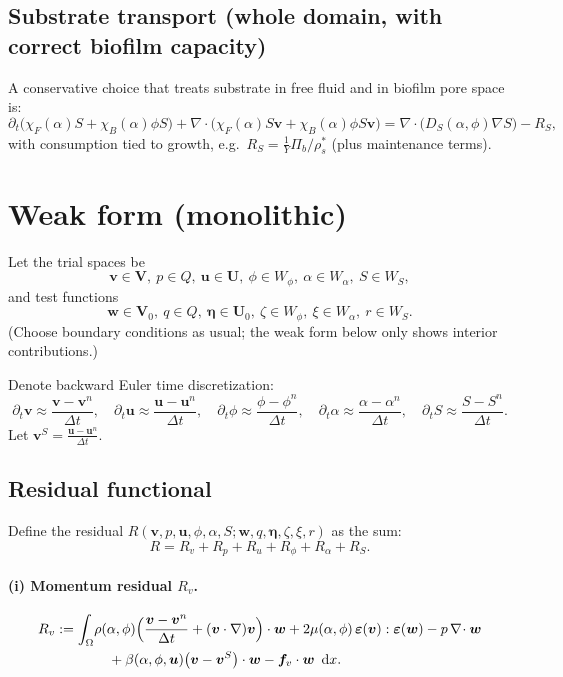 \documentclass[11pt]{article}
\newcommand{\dd}{\,\mathrm{d}}
\newcommand{\grad}{\nabla}
\newcommand{\divv}{\nabla\!\cdot}
\newcommand{\eps}{\bm{\varepsilon}}
\newcommand{\Dt}{\partial_t}
\begin{document}
\subsection{Substrate transport (whole domain, with correct biofilm capacity)}
A conservative choice that treats substrate in free fluid and in biofilm pore space is:
\begin{equation}\label{eq:substrate}
\Dt\big(\chi_F(\alpha)S + \chi_B(\alpha)\phi S\big)
+\divv\big(\chi_F(\alpha)S\bm{v} + \chi_B(\alpha)\phi S \bm{v}\big)
= \divv\big(D_S(\alpha,\phi)\grad S\big) - R_S,
\end{equation}
with consumption tied to growth, e.g.\ $R_S = \frac{1}{Y}\Pi_b/\rho_s^\ast$ (plus maintenance terms).

\section{Weak form (monolithic)}

Let the trial spaces be
\[
\bm{v}\in \bm{V},\ p\in Q,\ \bm{u}\in \bm{U},\ \phi\in W_\phi,\ \alpha\in W_\alpha,\ S\in W_S,
\]
and test functions
\[
\bm{w}\in \bm{V}_0,\ q\in Q,\ \bm{\eta}\in \bm{U}_0,\ \zeta\in W_\phi,\ \xi\in W_\alpha,\ r\in W_S.
\]
(Choose boundary conditions as usual; the weak form below only shows interior contributions.)

Denote backward Euler time discretization:
\[
\Dt \bm{v}\approx \frac{\bm{v}-\bm{v}^n}{\Delta t},\quad
\Dt \bm{u}\approx \frac{\bm{u}-\bm{u}^n}{\Delta t},\quad
\Dt \phi\approx \frac{\phi-\phi^n}{\Delta t},\quad
\Dt \alpha\approx \frac{\alpha-\alpha^n}{\Delta t},\quad
\Dt S\approx \frac{S-S^n}{\Delta t}.
\]
Let $\bm{v}^S=\frac{\bm{u}-\bm{u}^n}{\Delta t}$.

\subsection*{Residual functional}
Define the residual $R(\bm{v},p,\bm{u},\phi,\alpha,S;\bm{w},q,\bm{\eta},\zeta,\xi,r)$ as the sum:
\[
R = R_v + R_p + R_u + R_\phi + R_\alpha + R_S.
\]

\paragraph{(i) Momentum residual $R_v$.}
\begin{align}
R_v :=
\int_\Omega &
\rho(\alpha,\phi)\Big(\frac{\bm{v}-\bm{v}^n}{\Delta t}+(\bm{v}\cdot\grad)\bm{v}\Big)\cdot \bm{w}
+ 2\mu(\alpha,\phi)\,\eps(\bm{v}):\eps(\bm{w})
- p\,\divv \bm{w} \notag\\
&\quad
+ \beta(\alpha,\phi,\bm{u})\big(\bm{v}-\bm{v}^S\big)\cdot \bm{w}
- \bm{f}_v\cdot\bm{w}
\ \dd x.
\label{eq:Rv}
\end{align}
\end{document}
